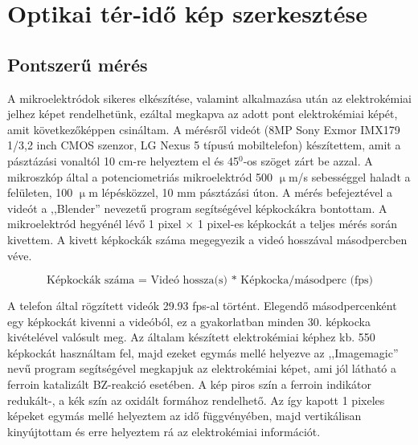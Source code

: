 \section{Optikai tér-idő kép szerkesztése}
\subsection{Pontszerű mérés}
A mikroelektródok sikeres elkészítése, valamint alkalmazása után az elektrokémiai jelhez képet rendelhetünk, ezáltal megkapva az adott pont elektrokémiai képét, amit következőképpen csináltam. A mérésről videót (8MP Sony Exmor IMX179 1/3,2 inch CMOS szenzor, LG Nexus 5 típusú mobiltelefon) készítettem, amit a pásztázási vonaltól 10 cm-re helyeztem el és 45$^0$-os szöget zárt be azzal. A mikroszkóp által a potenciometriás mikroelektród 500 $\upmu$m/s sebességgel haladt a felületen, 100 $\upmu$m lépésközzel, 10 mm pásztázási úton. A mérés befejeztével a videót a ,,Blender'' \cite{blender} nevezetű program segítségével képkockákra bontottam. A mikroelektród hegyénél lévő 1 pixel $\times$ 1 pixel-es képkockát a teljes mérés során kivettem. A kivett képkockák száma megegyezik a videó hosszával másodpercben véve.

\begin{equation} 
\textrm{Képkockák száma = Videó hossza(s) * Képkocka/másodperc (fps)}
\end{equation}

A telefon által rögzített videók 29.93 fps-al történt. Elegendő másodpercenként egy képkockát kivenni a videóból, ez a gyakorlatban minden 30. képkocka kivételével valósult meg.
Az általam készített elektrokémiai képhez kb. 550 képkockát használtam fel, majd ezeket egymás mellé helyezve az ,,Imagemagic'' \cite{imagemagick} nevű program segítségével megkapjuk az elektrokémiai képet, ami jól látható a ferroin katalizált BZ-reakció esetében. A kép piros szín a ferroin indikátor redukált-, a kék szín az oxidált formához rendelhető. Az így kapott 1 pixeles képeket egymás mellé helyeztem az idő függvényében, majd vertikálisan kinyújtottam és erre helyeztem rá az elektrokémiai információt.
